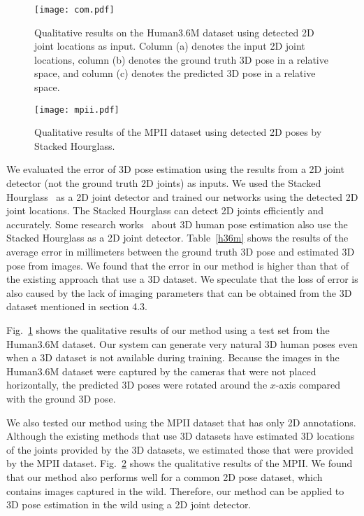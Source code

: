 \documentclass[runningheads]{llncs}
\newcommand{\matsui}[1]{\textbf{\textcolor{cyan}{[\textsc{MATSUI:} #1]}}}
\newcommand{\Tref}[1]{Table~\ref{#1}}
\newcommand{\Fref}[1]{Fig.~\ref{#1}}
\begin{document}
\begin{figure}[tb]
	\begin{center}
		\texttt{[image: com.pdf]}
		\caption{Qualitative results on the Human3.6M dataset using detected 2D joint locations as input. Column (a) denotes the input 2D joint locations, column (b) denotes the ground truth 3D pose in a relative space, and column (c) denotes the predicted 3D pose in a relative space.}
		\label{com}
	\end{center}
\end{figure}

\begin{figure}[tb]
	\begin{center}
		\texttt{[image: mpii.pdf]}
		\caption{Qualitative results of the MPII dataset using detected 2D poses by Stacked Hourglass.}
		\label{mpii-result}
	\end{center}
\end{figure}

We evaluated the error of 3D pose estimation using the results from a 2D joint detector (not the ground truth 2D joints) as inputs.
We used the Stacked Hourglass~\cite{newell2016stacked} as a 2D joint detector and trained our networks using the detected 2D joint locations.
The Stacked Hourglass can detect 2D joints efficiently and accurately.
Some research works~\cite{pavlakos2017coarse,martinez20173dbaseline} about 3D human pose estimation also use the Stacked Hourglass as a 2D joint detector.
\Tref{h36m} shows the results of the average error in millimeters between the ground truth 3D pose and estimated 3D pose from images.
We found that the error in our method is higher than that of the existing approach that use a 3D dataset.
We speculate that the loss of error is also caused by the lack of imaging parameters that can be obtained from the 3D dataset mentioned in section 4.3.

\Fref{com} shows the qualitative results of our method using a test set from the Human3.6M dataset.
Our system can generate very natural 3D human poses even when a 3D dataset is not available during training.
Because the images in the Human3.6M dataset were captured by the cameras that were not placed horizontally, the predicted 3D poses were rotated around the $x$-axis compared with the ground 3D pose.

We also tested our method using the MPII dataset that has only 2D annotations.
Although the existing methods that use 3D datasets have estimated 3D locations of the joints provided by the 3D datasets, we estimated those that were provided by the MPII dataset.
\Fref{mpii-result} shows the qualitative results of the MPII.
We found that our method also performs well for a common 2D pose dataset, which contains images captured in the wild.
Therefore, our method can be applied to 3D pose estimation in the wild using a 2D joint detector.
\end{document}
